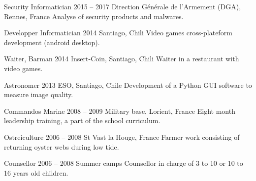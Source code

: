 \begin{joblist}

\item[Security Informatician]{2015 -- 2017}
	{Direction Générale de l'Armement (DGA), Rennes, France}
	{Analyse of security products and malwares.}

\item[Developper Informatician]{2014}
	{Santiago, Chili}
	{Video games cross-plateform development (android desktop).}

\item[Waiter, Barman]{2014}
	{Insert-Coin, Santiago, Chili}
	{Waiter in a restaurant with video games.}

\item[Astronomer]{2013}
	{ESO, Santiago, Chile}
	{Development of a Python GUI software to measure image quality.}


\item[Commandos Marine]{2008 -- 2009}
	{Military base, Lorient, France}
	{Eight ­month leadership training, a part of the school curriculum.}

\item[Ostreiculture]{2006 -- 2008}
	{St Vast la Houge, France}
	{Farmer work consisting of returning oyster webs during low tide.}


\item[Counsellor]{2006 -- 2008}
	{Summer camps}
	{Counsellor in charge of 3 to 10 or 10 to 16 years old children.}
\end{joblist}


\begin{skilllist}



\end{skilllist}
